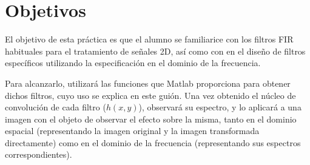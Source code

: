 \documentclass[10pt,twoside,spanish,a4paper]{article}
\begin{document}
\setcounter{ctPreg}{1}
\newcommand{\itemP}{ \item[{\color{blue}\fbox{\textbf{Tarea \arabic{ctPreg}:}}}] \addtocounter{ctPreg}{1}}  %
\newcommand{\itemB}{ \item[{\color{blue}$\bullet$} ]    }
\newcommand{\itemR}{ \item[{\color{blue}$\triangleright$} ]    }       %

\vspace{-8em}

\section*{Objetivos}

El objetivo de esta pr\'{a}ctica es que el alumno se familiarice con los filtros FIR
 habituales para el tratamiento de se\~{n}ales 2D, as\'{i} como con en el dise\~{n}o de filtros
espec\'{i}ficos utilizando la especificaci\'{o}n en el dominio de la frecuencia.

Para alcanzarlo, utilizar\'{a} las funciones que Matlab proporciona para obtener dichos
 filtros, cuyo uso se explica en este gui\'{o}n. Una vez obtenido el n\'{u}cleo de convoluci\'{o}n
de cada filtro ($h(x,y)$), observar\'{a} su espectro, y lo aplicar\'{a} a una imagen con el objeto
de observar el efecto sobre la misma, tanto en el dominio espacial (representando la
imagen original y la imagen transformada directamente) como en el dominio de la frecuencia
 (representando sus espectros correspondientes).
\end{document}
